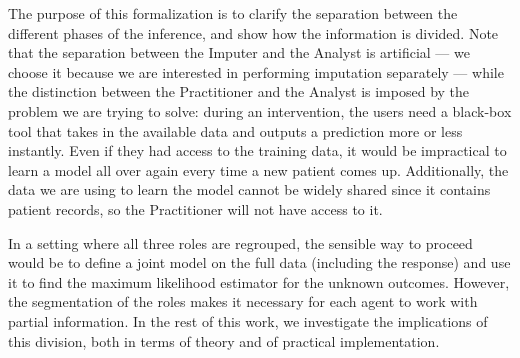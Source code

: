 The purpose of this formalization is to clarify the separation between the different phases of the inference, and show how the information is divided. Note that the separation between the Imputer and the Analyst is artificial --- we choose it because we are interested in performing imputation separately --- while the distinction between the Practitioner and the Analyst is imposed by the problem we are trying to solve: during an intervention, the users need a black-box tool that takes in the available data and outputs a prediction more or less instantly. Even if they had access to the training data, it would be impractical to learn a model all over again every time a new patient comes up. Additionally, the data we are using to learn the model cannot be widely shared since it contains patient records, so the Practitioner will not have access to it.

In a setting where all three roles are regrouped, the sensible way to proceed would be to define a joint model on the full data (including the response) and use it to find the maximum likelihood estimator for the unknown outcomes. However, the segmentation of the roles makes it necessary for each agent to work with partial information. In the rest of this work, we investigate the implications of this division, both in terms of theory and of practical implementation.

